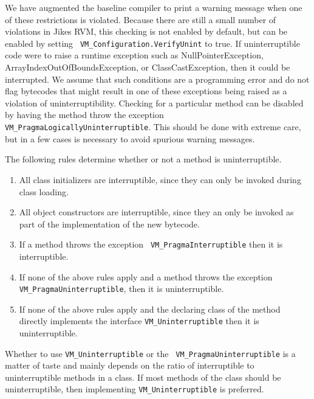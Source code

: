 We have augmented the baseline compiler to print a warning message
when one of these restrictions is violated.  Because there are still a
small number of violations in Jikes RVM, this checking is not enabled
by default, but can be enabled by setting {\tt
VM\_Configuration.VerifyUnint} to  true. 
If uninterruptible code were to raise a runtime exception such
as NullPointerException, ArrayIndexOutOfBoundsException, or
ClassCastException, then it could be interrupted.  We assume that such
conditions are a programming error and do not flag bytecodes that
might result in one of these exceptions being raised as a violation of
uninterruptibility. Checking for a particular method can be disabled
by having the method throw the exception {\tt
VM\_PragmaLogicallyUninterruptible}. This should be done with extreme
care, but in a few cases is necessary to avoid spurious warning
messages. 

The following rules determine whether or not a method is
uninterruptible.
\begin{enumerate}
\item{} All class initializers are interruptible, since they
can only be invoked during class loading.
\item{} All object constructors are interruptible, since they an
only be invoked as part of the implementation of the new bytecode.
\item{} If a method throws the exception {\tt
VM\_PragmaInterruptible} then it is interruptible.
\item{} If none of the above rules apply and a method throws the
exception {\tt VM\_PragmaUninterruptible}, then it is uninterruptible.
\item{} If none of the above rules apply and the declaring class of
the method directly implements the interface {\tt VM\_Uninterruptible}
then it is uninterruptible.
\end{enumerate}
Whether to use {\tt VM\_Uninterruptible} or the {\tt
VM\_PragmaUninterruptible} is a matter of taste and mainly depends on
the ratio of interruptible to uninterruptible methods in a class.  If
most methods of the class should be uninterruptible, then implementing
{\tt VM\_Uninterruptible} is preferred. 

